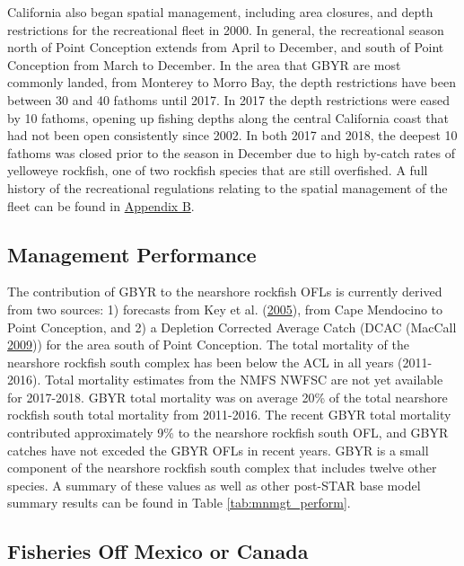 \documentclass[12pt,]{article}
\begin{document}
California also began spatial management, including area closures, and
depth restrictions for the recreational fleet in 2000. In general, the
recreational season north of Point Conception extends from April to
December, and south of Point Conception from March to December. In the
area that GBYR are most commonly landed, from Monterey to Morro Bay, the
depth restrictions have been between 30 and 40 fathoms until 2017. In
2017 the depth restrictions were eased by 10 fathoms, opening up fishing
depths along the central California coast that had not been open
consistently since 2002. In both 2017 and 2018, the deepest 10 fathoms
was closed prior to the season in December due to high by-catch rates of
yelloweye rockfish, one of two rockfish species that are still
overfished. A full history of the recreational regulations relating to
the spatial management of the fleet can be found in
\protect\hyperlink{appendix-b.-californias-recreational-fishery-regulations}{Appendix
B}.

\subsection{Management Performance}\label{management-performance-1}

The contribution of GBYR to the nearshore rockfish OFLs is currently
derived from two sources: 1) forecasts from Key et al.
(\protect\hyperlink{ref-Key2005}{2005}), from Cape Mendocino to Point
Conception, and 2) a Depletion Corrected Average Catch (DCAC (MacCall
\protect\hyperlink{ref-MacCall2009}{2009})) for the area south of Point
Conception. The total mortality of the nearshore rockfish south complex
has been below the ACL in all years (2011-2016). Total mortality
estimates from the NMFS NWFSC are not yet available for 2017-2018. GBYR
total mortality was on average 20\% of the total nearshore rockfish
south total mortality from 2011-2016. The recent GBYR total mortality
contributed approximately 9\% to the nearshore rockfish south OFL, and
GBYR catches have not exceded the GBYR OFLs in recent years. GBYR is a
small component of the nearshore rockfish south complex that includes
twelve other species. A summary of these values as well as other
post-STAR base model summary results can be found in Table
\ref{tab:mnmgt_perform}.

\subsection{Fisheries Off Mexico or
Canada}\label{fisheries-off-mexico-or-canada}
\end{document}
